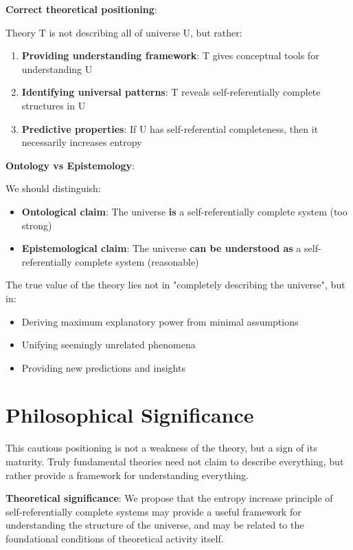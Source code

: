 \textbf{Correct theoretical positioning}:

Theory T is not describing all of universe U, but rather:
\begin{enumerate}
\item \textbf{Providing understanding framework}: T gives conceptual tools for understanding U
\item \textbf{Identifying universal patterns}: T reveals self-referentially complete structures in U
\item \textbf{Predictive properties}: If U has self-referential completeness, then it necessarily increases entropy
\end{enumerate}

\textbf{Ontology vs Epistemology}:

We should distinguish:
\begin{itemize}
\item \textbf{Ontological claim}: The universe \textbf{is} a self-referentially complete system (too strong)
\item \textbf{Epistemological claim}: The universe \textbf{can be understood as} a self-referentially complete system (reasonable)
\end{itemize}

The true value of the theory lies not in "completely describing the universe", but in:
\begin{itemize}
\item Deriving maximum explanatory power from minimal assumptions
\item Unifying seemingly unrelated phenomena
\item Providing new predictions and insights
\end{itemize}

\section{Philosophical Significance}
\label{sec:ch09_defense:philosophical-significance}

This cautious positioning is not a weakness of the theory, but a sign of its maturity. Truly fundamental theories need not claim to describe everything, but rather provide a framework for understanding everything.

\textbf{Theoretical significance}: We propose that the entropy increase principle of self-referentially complete systems may provide a useful framework for understanding the structure of the universe, and may be related to the foundational conditions of theoretical activity itself.

